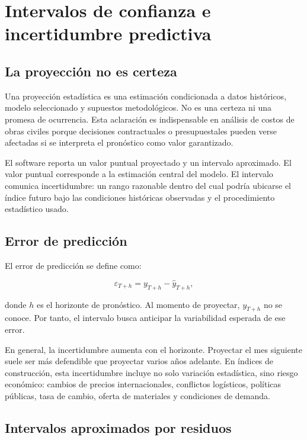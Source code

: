 \section{Intervalos de confianza e incertidumbre predictiva}

\subsection{La proyección no es certeza}

Una proyección estadística es una estimación condicionada a datos históricos, modelo seleccionado y supuestos metodológicos. No es una certeza ni una promesa de ocurrencia. Esta aclaración es indispensable en análisis de costos de obras civiles porque decisiones contractuales o presupuestales pueden verse afectadas si se interpreta el pronóstico como valor garantizado.

El software reporta un valor puntual proyectado y un intervalo aproximado. El valor puntual corresponde a la estimación central del modelo. El intervalo comunica incertidumbre: un rango razonable dentro del cual podría ubicarse el índice futuro bajo las condiciones históricas observadas y el procedimiento estadístico usado.

\subsection{Error de predicción}

El error de predicción se define como:

\begin{equation}
    \varepsilon_{T+h} = y_{T+h} - \hat{y}_{T+h},
    \label{eq:error_prediccion}
\end{equation}

donde \(h\) es el horizonte de pronóstico. Al momento de proyectar, \(y_{T+h}\) no se conoce. Por tanto, el intervalo busca anticipar la variabilidad esperada de ese error.

En general, la incertidumbre aumenta con el horizonte. Proyectar el mes siguiente suele ser más defendible que proyectar varios años adelante. En índices de construcción, esta incertidumbre incluye no solo variación estadística, sino riesgo económico: cambios de precios internacionales, conflictos logísticos, políticas públicas, tasa de cambio, oferta de materiales y condiciones de demanda.

\subsection{Intervalos aproximados por residuos}

